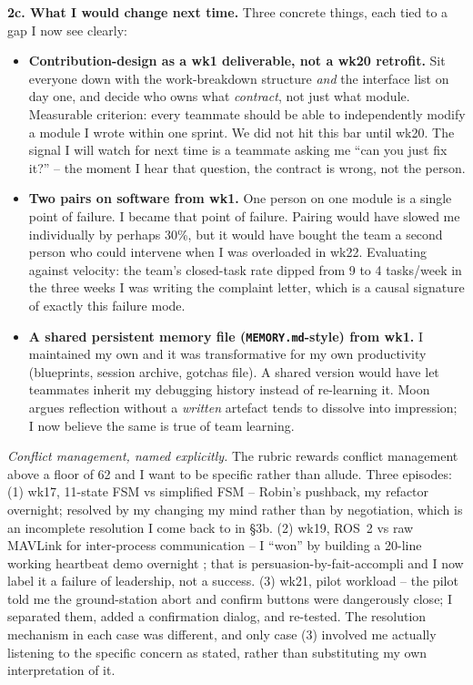 \textbf{2c. What I would change next time.}  Three concrete things, each tied to a gap I now see clearly:

\begin{itemize}
\item \textbf{Contribution-design as a wk1 deliverable, not a wk20 retrofit.} Sit everyone down with the work-breakdown structure \textit{and} the interface list on day one, and decide who owns what \textit{contract}, not just what module. Measurable criterion: every teammate should be able to independently modify a module I wrote within one sprint. We did not hit this bar until wk20. The signal I will watch for next time is a teammate asking me ``can you just fix it?'' -- the moment I hear that question, the contract is wrong, not the person.
\item \textbf{Two pairs on software from wk1.} One person on one module is a single point of failure. I became that point of failure. Pairing would have slowed me individually by perhaps 30\%, but it would have bought the team a second person who could intervene when I was overloaded in wk22. Evaluating against velocity: the team's closed-task rate dipped from 9 to 4 tasks/week in the three weeks I was writing the complaint letter, which is a causal signature of exactly this failure mode.
\item \textbf{A shared persistent memory file (\texttt{MEMORY.md}-style) from wk1.} I maintained my own and it was transformative for my own productivity (blueprints, session archive, gotchas file). A shared version would have let teammates inherit my debugging history instead of re-learning it. Moon \cite{moon2004} argues reflection without a \textit{written} artefact tends to dissolve into impression; I now believe the same is true of team learning.
\end{itemize}

\textit{Conflict management, named explicitly.} The rubric rewards conflict management above a floor of 62 and I want to be specific rather than allude. Three episodes: (1) wk17, 11-state FSM vs simplified FSM -- Robin's pushback, my refactor overnight; resolved by my changing my mind rather than by negotiation, which is an incomplete resolution I come back to in \S3b. (2) wk19, ROS~2 vs raw MAVLink for inter-process communication -- I ``won'' by building a 20-line working heartbeat demo overnight ; that is persuasion-by-fait-accompli and I now label it a failure of leadership, not a success. (3) wk21, pilot workload -- the pilot told me the ground-station abort and confirm buttons were dangerously close; I separated them, added a confirmation dialog, and re-tested. The resolution mechanism in each case was different, and only case (3) involved me actually listening to the specific concern as stated, rather than substituting my own interpretation of it.
